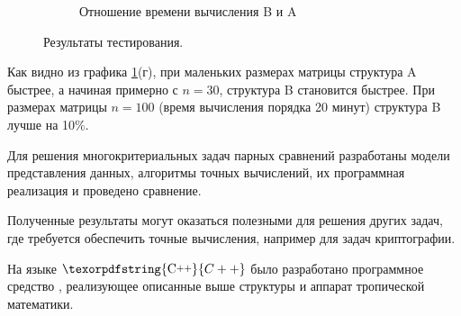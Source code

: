 \documentclass[specialist,
substylefile = spbu.rtx,
               subf,href,colorlinks=true, 12pt]{disser}
\newcommand{\Cpp}{\texorpdfstring{\mbox{C\raisebox{.35ex}{\textsmaller[2]{++}}}\xspace}{C++}}
\begin{document}
\begin{figure}[h]
\begin{minipage}[t]{\columnwidth}
\begin{subfigure}[t]{0.475\linewidth}
            \caption{Отношение времени вычисления B и A}
        \end{subfigure}
        \caption{Результаты тестирования.}
        \label{fig:fig1}
        \end{minipage}
    \end{figure}


    Как видно из графика \ref{fig:fig1}(г), при маленьких размерах матрицы структура A быстрее, а начиная примерно с $n = 30$, структура B становится быстрее. При размерах матрицы $n = 100$ (время вычисления порядка 20 минут) структура B лучше на 10\%.




    \conclusion

    Для решения многокритериальных задач парных сравнений разработаны модели представления данных, алгоритмы точных вычислений, их программная реализация и проведено сравнение.

    Полученные результаты могут оказаться полезными для решения других задач, где требуется обеспечить точные вычисления, например для задач криптографии.
    
    На языке $\Cpp$ было разработано программное средство \cite{SourceCode}, реализующее описанные выше структуры и аппарат тропической математики.  
    
    \renewcommand{\refname}{}
    \vspace{-25pt}
    
    




\end{document}
